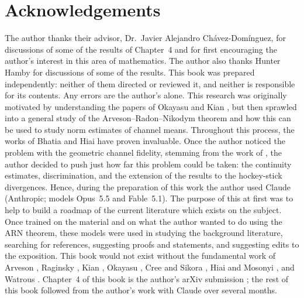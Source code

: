 \chapter*{Acknowledgements}

The author thanks their advisor, Dr.\ Javier Alejandro Ch\'avez-Dom\'inguez, for discussions of some of the results of Chapter~4 and for first encouraging the author's interest in this area of mathematics. The author also thanks Hunter Hamby for discussions of some of the results. This book was prepared independently: neither of them directed or reviewed it, and neither is responsible for its contents. Any errors are the author's alone. This research was originally motivated by understanding the papers of Okayasu \cite{Okayasu2026} and Kian \cite{kian2026relative}, but then sprawled into a general study of the Arveson--Radon--Nikodym theorem and how this can be used to study norm estimates of channel means. Throughout this process, the works of Bhatia \cite{bhatia1997matrix} and Hiai \cite{hiai2010matrix} have proven invaluable. Once the author noticed the problem with the geometric channel fidelity, stemming from the work of \cite{cree2020fidelity}, the author decided to push just how far this problem could be taken: the continuity estimates, discrimination, and the extension of the results to the hockey-stick divergences. Hence, during the preparation of this work the author used Claude (Anthropic; models Opus~5.5 and Fable~5.1). The purpose of this at first was to help to build a roadmap of the current literature which exists on the subject. Once trained on the material and on what the author wanted to do using the ARN theorem, these models were used in studying the background literature, searching for references, suggesting proofs and statements, and suggesting edits to the exposition. This book would not exist without the fundamental work of Arveson \cite{arveson1969subalgebras}, Raginsky \cite{Raginsky2003}, Kian \cite{kian2026relative}, Okayasu \cite{Okayasu2026}, Cree and Sikora \cite{cree2020fidelity}, Hiai and Mosonyi \cite{HiaiMosonyi2017}, and Watrous \cite{watrous2018theory}. Chapter~4 of this book is the author's arXiv submission \cite{Jones2026}; the rest of this book followed from the author's work with Claude over several months.
